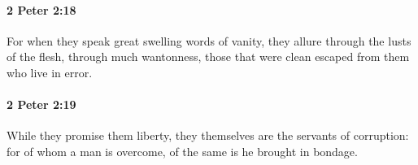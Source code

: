 		\paragraph{2 Peter 2:18} %
			\label{2PETER-2-18}

			For when they speak great swelling words of vanity, they allure through the lusts of the flesh, through much wantonness, those that were clean escaped from them who live in error.

			\begin{framed}
			\scriptsize
				\begin{compactdesc}
					\item[SBLG] 
				\end{compactdesc}
			\end{framed}

		\paragraph{2 Peter 2:19} %
			\label{2PETER-2-19}

			While they promise them liberty, they themselves are the servants of corruption: for of whom a man is overcome, of the same is he brought in bondage.

